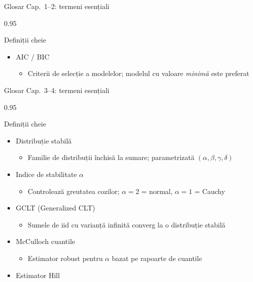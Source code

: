 \documentclass[9pt, aspectratio=169, t]{beamer}
\begin{document}
\begin{frame}[shrink=25]{Glosar Cap.~1--2: termeni esențiali}
\begin{cminipage}{0.95\textwidth}
\begin{block}{Definiții cheie}
\begin{itemize}
    \begin{itemize}\setlength{\itemsep}{0pt}
        \item Test combinat al asimetriei și kurtosis pentru normalitate
    \end{itemize}
    \item AIC / BIC
    \begin{itemize}\setlength{\itemsep}{0pt}
        \item Criterii de selecție a modelelor; modelul cu valoare \emph{minimă} este preferat
    \end{itemize}
\end{itemize}
\end{block}
\end{cminipage}
\end{frame}

\begin{frame}[shrink=25]{Glosar Cap.~3--4: termeni esențiali}
\begin{cminipage}{0.95\textwidth}
\begin{block}{Definiții cheie}
\begin{itemize}\setlength{\itemsep}{0pt}
    \item Distribuție stabilă
    \begin{itemize}\setlength{\itemsep}{0pt}
        \item Familie de distribuții închisă la sumare; parametrizată $(\alpha, \beta, \gamma, \delta)$
    \end{itemize}
    \item Indice de stabilitate $\alpha$
    \begin{itemize}\setlength{\itemsep}{0pt}
        \item Controlează greutatea cozilor; $\alpha = 2$ = normal, $\alpha = 1$ = Cauchy
    \end{itemize}
    \item GCLT (Generalized CLT)
    \begin{itemize}\setlength{\itemsep}{0pt}
        \item Sumele de iid cu varianță infinită converg la o distribuție stabilă
    \end{itemize}
    \item McCulloch cuantile
    \begin{itemize}\setlength{\itemsep}{0pt}
        \item Estimator robust pentru $\alpha$ bazat pe rapoarte de cuantile
    \end{itemize}
    \item Estimator Hill

\end{itemize}
\end{block}
\end{cminipage}
\end{frame}
\end{document}
